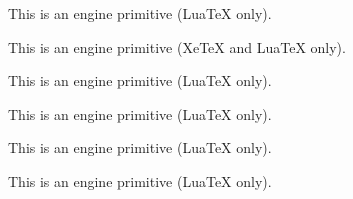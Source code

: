 \begin{function}[]
  {
    \Umathaxis
  }
  \begin{syntax}
  \end{syntax}
  This is an engine primitive (Lua\TeX{} only).
\end{function}



\begin{function}[]
  {
    \Umathcode
  }
  \begin{syntax}
  \end{syntax}
  This is an engine primitive (Xe\TeX{} and Lua\TeX{} only).
\end{function}



\begin{function}[]
  {
    \Umathsubshiftdown
  }
  \begin{syntax}
  \end{syntax}
  This is an engine primitive (Lua\TeX{} only).
\end{function}



\begin{function}[]
  {
    \Umathsubtopmax
  }
  \begin{syntax}
  \end{syntax}
  This is an engine primitive (Lua\TeX{} only).
\end{function}



\begin{function}[]
  {
    \Umathsupbottommin
  }
  \begin{syntax}
  \end{syntax}
  This is an engine primitive (Lua\TeX{} only).
\end{function}



\begin{function}[]
  {
    \Umathsupshiftup
  }
  \begin{syntax}
  \end{syntax}
  This is an engine primitive (Lua\TeX{} only).
\end{function}



\begin{function}[]
  {
    \UndeclareTextCommand
  }
  \begin{syntax}
  \end{syntax}

\end{function}




